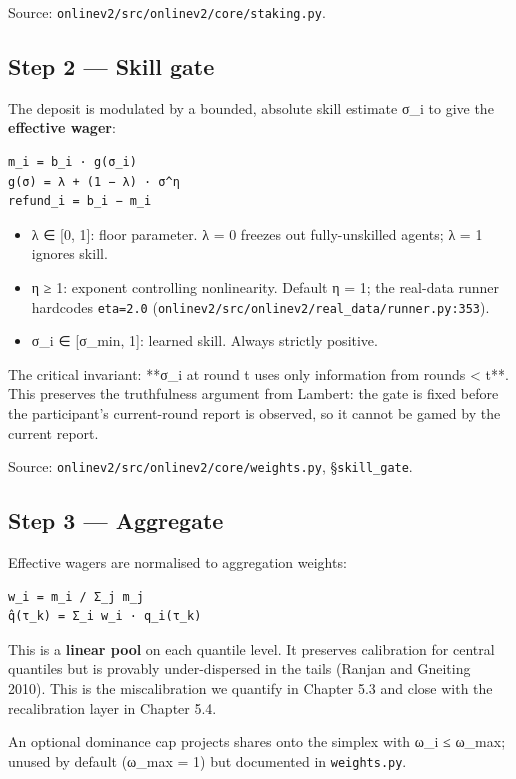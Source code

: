 \documentclass[11pt,a4paper,openany]{report}
\begin{document}
Source: \texttt{onlinev2/src/onlinev2/core/staking.py}.

\subsection{Step 2 — Skill gate}

The deposit is modulated by a bounded, absolute skill estimate σ\_i to
give the \textbf{effective wager}:

\begin{verbatim}
m_i = b_i · g(σ_i)
g(σ) = λ + (1 − λ) · σ^η
refund_i = b_i − m_i
\end{verbatim}

\begin{itemize}
  \item λ ∈ [0, 1]: floor parameter. λ = 0 freezes out fully-unskilled agents;
    λ = 1 ignores skill.
  \item η ≥ 1: exponent controlling nonlinearity. Default η = 1; the real-data
    runner hardcodes \texttt{eta=2.0}
    (\texttt{onlinev2/src/onlinev2/real\_data/runner.py:353}).
  \item σ\_i ∈ [σ\_min, 1]: learned skill. Always strictly positive.
\end{itemize}

The critical invariant: **σ\_i at round t uses only information from
rounds < t**. This preserves the truthfulness argument from Lambert: the
gate is fixed before the participant's current-round report is observed,
so it cannot be gamed by the current report.

Source: \texttt{onlinev2/src/onlinev2/core/weights.py}, §\texttt{skill\_gate}.

\subsection{Step 3 — Aggregate}

Effective wagers are normalised to aggregation weights:

\begin{verbatim}
w_i = m_i / Σ_j m_j
q̂(τ_k) = Σ_i w_i · q_i(τ_k)
\end{verbatim}

This is a \textbf{linear pool} on each quantile level. It preserves calibration
for central quantiles but is provably under-dispersed in the tails
(Ranjan and Gneiting 2010). This is the miscalibration we quantify in
Chapter 5.3 and close with the recalibration layer in Chapter 5.4.

An optional dominance cap projects shares onto the simplex with
ω\_i ≤ ω\_max; unused by default (ω\_max = 1) but documented in
\texttt{weights.py}.
\end{document}
